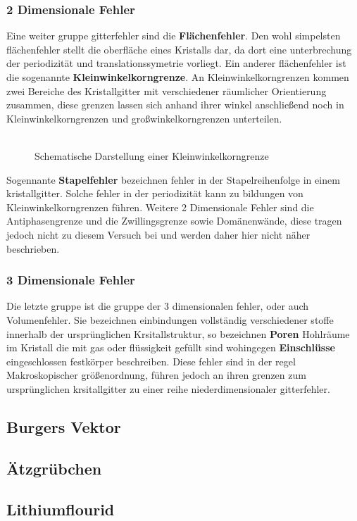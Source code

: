         \subsubsection*{2 Dimensionale Fehler}
            Eine weiter gruppe gitterfehler sind die \textbf{Flächenfehler}. Den wohl simpelsten flächenfehler
            stellt die oberfläche eines Kristalls dar, da dort eine unterbrechung der periodizität und translationssymetrie vorliegt.
            Ein anderer flächenfehler ist die sogenannte \textbf{Kleinwinkelkorngrenze}. An Kleinwinkelkorngrenzen kommen zwei 
            Bereiche des Kristallgitter mit verschiedener räumlicher Orientierung zusammen, diese grenzen lassen sich anhand ihrer winkel
            anschließend noch in Kleinwinkelkorngrenzen und großwinkelkorngrenzen unterteilen.
            \begin{figure}[H]
                \centering
                \includegraphics[width=0.5]{Images/kleinwinkelkorngrenze}
                \caption{Schematische Darstellung einer Kleinwinkelkorngrenze}
            \end{figure}
            Sogennante \textbf{Stapelfehler} bezeichnen fehler in der Stapelreihenfolge in einem kristallgitter. Solche fehler in der periodizität
            kann zu bildungen von Kleinwinkelkorngrenzen führen.
            Weitere 2 Dimensionale Fehler sind die Antiphasengrenze und die Zwillingsgrenze sowie Domänenwände, diese tragen jedoch nicht
            zu diesem Versuch bei und werden daher hier nicht näher beschrieben.
        \subsubsection*{3 Dimensionale Fehler}
            Die letzte gruppe ist die gruppe der 3 dimensionalen fehler, oder auch Volumenfehler. Sie bezeichnen einbindungen vollständig verschiedener stoffe innerhalb der ursprünglichen
            Krsitallstruktur, so bezeichnen \textbf{Poren} Hohlräume im Kristall die mit gas oder flüssigkeit gefüllt sind wohingegen
            \textbf{Einschlüsse} eingeschlossen festkörper beschreiben.
            Diese fehler sind in der regel Makroskopischer größenordnung, führen jedoch an ihren grenzen zum ursprünglichen krsitallgitter
            zu einer reihe niederdimensionaler gitterfehler.

    \subsection{Burgers Vektor}
            
    \subsection{Ätzgrübchen}

    \subsection{Lithiumflourid}